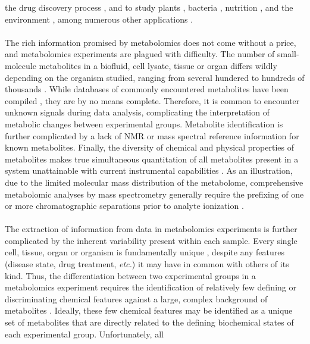 \begin{doublespace}
the drug discovery process \cite{powers:mrc2009,wilcoxen:eodd2010}, and to
study plants \cite{hall:pcell2002}, bacteria
\cite{zhang:jiomic2013,tang:cgen2011}, nutrition
\cite{mcniven:jnb2011}, and the environment
\cite{bundy:metab2009}, among numerous other applications
\cite{baker:nmeth2011}.
\\\\
The rich information promised by metabolomics does not come without a price,
and metabolomics experiments are plagued with difficulty. The number of
small-molecule metabolites in a biofluid, cell lysate, tissue or organ differs
wildly depending on the organism studied, ranging from several hundered to
hundreds of thousands \cite{dunn:trac2005}. While databases of commonly
encountered metabolites have been compiled
\cite{wishart:nar2007,cui:nbiot2008,kind:anchem2009}, they are by no
means complete. Therefore, it is common to encounter unknown signals during
data analysis, complicating the interpretation of metabolic changes between
experimental groups. Metabolite identification is further complicated by a
lack of NMR or mass spectral reference information for known metabolites.
Finally, the diversity of chemical and physical properties of metabolites
makes true simultaneous quantitation of all metabolites present in a system
unattainable with current instrumental capabilities
\cite{lindon:cmr2000,dunn:trac2005,dettmer:msr2007}. As an illustration,
due to the limited molecular mass distribution of the metabolome, comprehensive
metabolomic analyses by mass spectrometry generally require the prefixing of
one or more chromatographic separations prior to analyte ionization
\cite{kell:opin2004,viswanadhan:acsccc2011}.
\\\\
The extraction of information from data in metabolomics experiments is further
complicated by the inherent variability present within each sample. Every
single cell, tissue, organ or organism is fundamentally unique
\cite{rubakhin:nmeth2011}, despite any features (disease state, drug
treatment, {\it etc.}) it may have in common with others of its kind. Thus,
the differentiation between two experimental groups in a metabolomics
experiment requires the identification of relatively few defining or
discriminating chemical features against a large, complex background of
metabolites \cite{wishart:nar2007}. Ideally, these few chemical features
may be identified as a unique set of metabolites that are directly related to
the defining biochemical states of each experimental group. Unfortunately, all

\end{doublespace}
